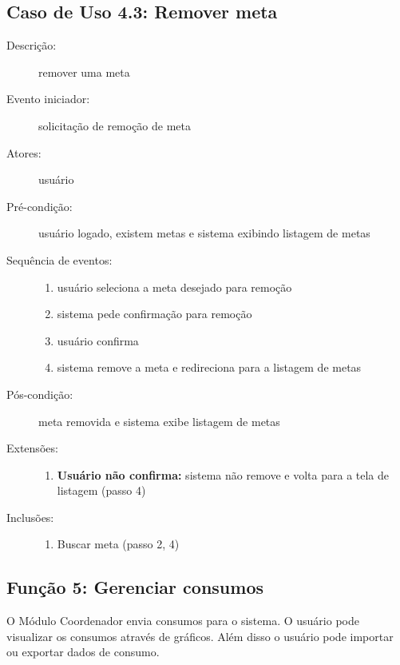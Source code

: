 \subsection{Caso de Uso 4.3: Remover meta}
\begin{description}
	\item[Descrição:] remover uma meta
	\item[Evento iniciador:] solicitação de remoção de meta
	\item[Atores:] usuário
	\item[Pré-condição:] usuário logado, existem metas e sistema exibindo listagem de metas
	\item[Sequência de eventos:] \hfill
		\begin{enumerate}
			\item{usuário seleciona a meta desejado para remoção}
			\item{sistema pede confirmação para remoção}
			\item{usuário confirma}
			\item{sistema remove a meta e redireciona para a listagem de metas}
		\end{enumerate}
	\item[Pós-condição:] meta removida e sistema exibe listagem de metas
	\item[Extensões:] \hfill
		\begin{enumerate}
			\item{\textbf{Usuário não confirma:} sistema não remove e volta para a tela de listagem (passo 4)}
		\end{enumerate}
	\item[Inclusões:] \hfill
		\begin{enumerate}
			\item{Buscar meta (passo 2, 4)}
		\end{enumerate}
\end{description}
\subsection{Função 5: Gerenciar consumos}
O Módulo Coordenador envia consumos para o sistema. O usuário pode visualizar os consumos através de gráficos. Além disso o usuário pode importar ou exportar dados de consumo.
%
